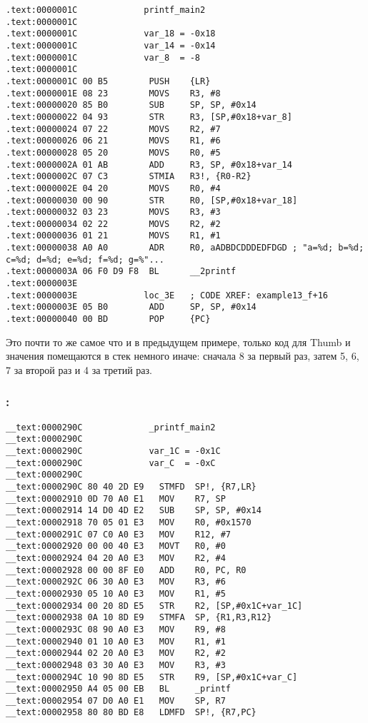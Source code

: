 \begin{lstlisting}
.text:0000001C             printf_main2
.text:0000001C
.text:0000001C             var_18 = -0x18
.text:0000001C             var_14 = -0x14
.text:0000001C             var_8  = -8
.text:0000001C
.text:0000001C 00 B5        PUSH    {LR}
.text:0000001E 08 23        MOVS    R3, #8
.text:00000020 85 B0        SUB     SP, SP, #0x14
.text:00000022 04 93        STR     R3, [SP,#0x18+var_8]
.text:00000024 07 22        MOVS    R2, #7
.text:00000026 06 21        MOVS    R1, #6
.text:00000028 05 20        MOVS    R0, #5
.text:0000002A 01 AB        ADD     R3, SP, #0x18+var_14
.text:0000002C 07 C3        STMIA   R3!, {R0-R2}
.text:0000002E 04 20        MOVS    R0, #4
.text:00000030 00 90        STR     R0, [SP,#0x18+var_18]
.text:00000032 03 23        MOVS    R3, #3
.text:00000034 02 22        MOVS    R2, #2
.text:00000036 01 21        MOVS    R1, #1
.text:00000038 A0 A0        ADR     R0, aADBDCDDDEDFDGD ; "a=%d; b=%d; c=%d; d=%d; e=%d; f=%d; g=%"...
.text:0000003A 06 F0 D9 F8  BL      __2printf
.text:0000003E
.text:0000003E             loc_3E   ; CODE XREF: example13_f+16
.text:0000003E 05 B0        ADD     SP, SP, #0x14
.text:00000040 00 BD        POP     {PC}
\end{lstlisting}

Это почти то же самое что и в предыдущем примере, только код для Thumb и значения помещаются в 
стек немного иначе: сначала 8 за первый раз, затем 5, 6, 7 за второй раз и 4 за третий раз.

\subsubsection{\OptimizingXcodeIV: \ARMMode}

\begin{lstlisting}
__text:0000290C             _printf_main2
__text:0000290C
__text:0000290C             var_1C = -0x1C
__text:0000290C             var_C  = -0xC
__text:0000290C
__text:0000290C 80 40 2D E9   STMFD  SP!, {R7,LR}
__text:00002910 0D 70 A0 E1   MOV    R7, SP
__text:00002914 14 D0 4D E2   SUB    SP, SP, #0x14
__text:00002918 70 05 01 E3   MOV    R0, #0x1570
__text:0000291C 07 C0 A0 E3   MOV    R12, #7
__text:00002920 00 00 40 E3   MOVT   R0, #0
__text:00002924 04 20 A0 E3   MOV    R2, #4
__text:00002928 00 00 8F E0   ADD    R0, PC, R0
__text:0000292C 06 30 A0 E3   MOV    R3, #6
__text:00002930 05 10 A0 E3   MOV    R1, #5
__text:00002934 00 20 8D E5   STR    R2, [SP,#0x1C+var_1C]
__text:00002938 0A 10 8D E9   STMFA  SP, {R1,R3,R12}
__text:0000293C 08 90 A0 E3   MOV    R9, #8
__text:00002940 01 10 A0 E3   MOV    R1, #1
__text:00002944 02 20 A0 E3   MOV    R2, #2
__text:00002948 03 30 A0 E3   MOV    R3, #3
__text:0000294C 10 90 8D E5   STR    R9, [SP,#0x1C+var_C]
__text:00002950 A4 05 00 EB   BL     _printf
__text:00002954 07 D0 A0 E1   MOV    SP, R7
__text:00002958 80 80 BD E8   LDMFD  SP!, {R7,PC}
\end{lstlisting}

